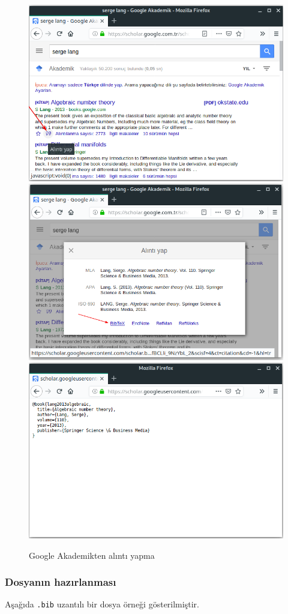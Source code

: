 \documentclass[
  10pt,
]{scrbook}
\theoremstyle{definition}
\theoremstyle{definition}
\theoremstyle{definition}
\theoremstyle{definition}
\theoremstyle{remark}
\begin{document}
\begin{figure}

{\centering \includegraphics[width=0.33\linewidth]{images/galinti1} \includegraphics[width=0.33\linewidth]{images/galinti2} \includegraphics[width=0.33\linewidth]{images/galinti3} 

}

\caption{Google Akademikten alıntı yapma}\label{fig:fig-google}
\end{figure}

\hypertarget{dosyanux131n-hazux131rlanmasux131}{%
\subsubsection{Dosyanın hazırlanması}\label{dosyanux131n-hazux131rlanmasux131}}

Aşağıda \texttt{.bib} uzantılı bir dosya örneği gösterilmiştir.
\end{document}
